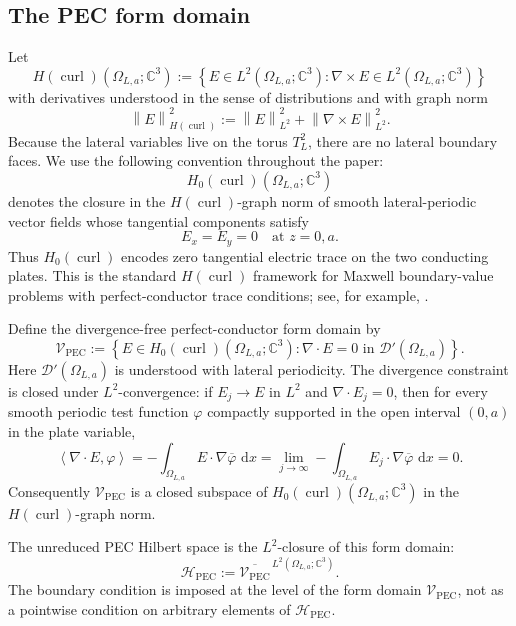 \documentclass[11pt]{article}
\providecommand{\C}{\mathbb{C}}
\providecommand{\dd}{\,\mathrm{d}}
\providecommand{\curl}{\operatorname{curl}}
\providecommand{\norm}[1]{\left\lVert #1\right\rVert}
\providecommand{\inner}[2]{\left\langle #1,#2\right\rangle}
\providecommand{\set}[1]{\left\{#1\right\}}
\providecommand{\OmegaLa}{\Omega_{L,a}}
\providecommand{\TtwoL}{T_L^2}
\providecommand{\HPEC}{\mathcal H_{\mathrm{PEC}}}
\providecommand{\VPEC}{\mathcal V_{\mathrm{PEC}}}
\providecommand{\Hcurl}{H(\operatorname{curl})}
\providecommand{\Hzcurl}{H_0(\operatorname{curl})}
\numberwithin{equation}{section}
\begin{document}
\subsection{The PEC form domain}
\label{subsec:pec-domain}

Let
\[
    \Hcurl(\OmegaLa;\C^3)
    :=
    \set{E\in L^2(\OmegaLa;\C^3):\nabla\times E\in L^2(\OmegaLa;\C^3)}
\]
with derivatives understood in the sense of distributions and with graph norm
\[
    \norm{E}_{\Hcurl}^2
    :=
    \norm{E}_{L^2}^2+\norm{\nabla\times E}_{L^2}^2 .
\]
Because the lateral variables live on the torus \(\TtwoL\), there are no lateral boundary faces.  We use the following convention throughout the paper:
\[
    \Hzcurl(\OmegaLa;\C^3)
\]
denotes the closure in the \(\Hcurl\)-graph norm of smooth lateral-periodic vector fields whose tangential components satisfy
\[
    E_x=E_y=0
    \quad\text{at }z=0,a .
\]
Thus \(\Hzcurl\) encodes zero tangential electric trace on the two conducting plates.
This is the standard \(H(\curl)\) framework for Maxwell boundary-value
problems with perfect-conductor trace conditions; see, for example,
\cite{Monk2003}.

Define the divergence-free perfect-conductor form domain by
\begin{equation}
\label{eq:VPEC-def}
    \VPEC
    :=
    \set{
        E\in \Hzcurl(\OmegaLa;\C^3):
        \nabla\cdot E=0\text{ in }\mathcal D'(\OmegaLa)
    } .
\end{equation}
Here \(\mathcal D'(\OmegaLa)\) is understood with lateral periodicity.  The divergence constraint is closed under \(L^2\)-convergence: if \(E_j\to E\) in \(L^2\) and \(\nabla\cdot E_j=0\), then for every smooth periodic test function \(\varphi\) compactly supported in the open interval \((0,a)\) in the plate variable,
\[
    \inner{\nabla\cdot E}{\varphi}
    =
    -\int_{\OmegaLa} E\cdot\nabla\overline{\varphi}\,\dd x
    =
    \lim_{j\to\infty}
    -\int_{\OmegaLa} E_j\cdot\nabla\overline{\varphi}\,\dd x
    =0 .
\]
Consequently \(\VPEC\) is a closed subspace of \(\Hzcurl(\OmegaLa;\C^3)\) in the \(\Hcurl\)-graph norm.

The unreduced PEC Hilbert space is the \(L^2\)-closure of this form domain:
\begin{equation}
\label{eq:HPEC-def}
    \HPEC:=\overline{\VPEC}^{\,L^2(\OmegaLa;\C^3)} .
\end{equation}
The boundary condition is imposed at the level of the form domain \(\VPEC\), not as a pointwise condition on arbitrary elements of \(\HPEC\).
\end{document}
